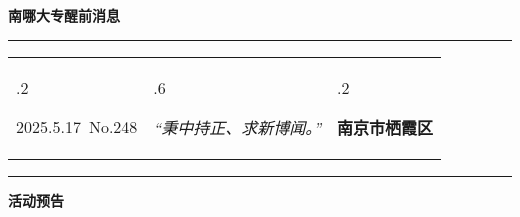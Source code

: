 \documentclass[letterpaper, 12pt]{article}
\begin{document}
\begin{center}
    \Huge\textbf{南哪大专醒前消息}
\end{center}
\vspace{4mm}
\hrule
\renewcommand\tabularxcolumn[1]{m{#1}}
\begin{tabularx}{\textwidth}{>{\hsize.2\hsize}X>{\hsize.6\hsize}X>{\hsize.2\hsize}X}
    \begin{flushleft}
        2025.5.17\, No.248
    \end{flushleft}
    &
    \begin{center}
        \textit{“秉中持正、求新博闻。”}
    \end{center}
    &
    \begin{flushright}
        \textbf{南京市栖霞区}
    \end{flushright}
\end{tabularx}
\vspace{-3.5mm}
\hrule
\vspace{4mm}
\centerline{\huge\textbf{活动预告}}
\end{document}
